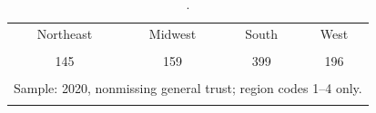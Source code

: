 \begin{table}[htbp]\centering
\caption{.}
\label{tab:region_counts_4col_2020}
\begin{tabular}{cccc}\toprule
Northeast & Midwest & South & West \\\\ \midrule
145 & 159 & 399 & 196 \\\\
\bottomrule
\multicolumn{4}{l}{\footnotesize Sample: 2020, nonmissing general trust; region codes 1--4 only.} \\\\
\end{tabular}\end{table}
